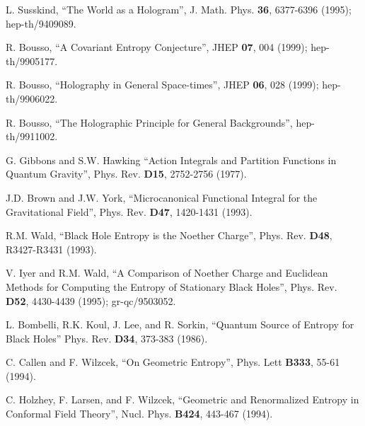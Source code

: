 \documentclass[12pt]{article}
\newcommand{\comment}[1]{}
\newcommand{\keywords}[1]{}
\begin{document}
\begin{thebibliography}{999}
\comment{article} L. Susskind, ``The World as a
Hologram'', J. Math. Phys. {\bf 36}, 6377-6396
(1995); hep-th/9409089. \keywords{quantum gravity, entropy bounds}

\comment{article} R. Bousso, ``A Covariant Entropy
Conjecture'', JHEP {\bf 07}, 004 (1999);
hep-th/9905177. \keywords{quantum gravity, entropy bounds}

\comment{article} R. Bousso, ``Holography in General
Space-times'', JHEP {\bf 06}, 028 (1999);
hep-th/9906022. \keywords{quantum gravity, entropy bounds}

\comment{online} R. Bousso, ``The Holographic Principle
for General Backgrounds'', hep-th/9911002. \keywords{quantum gravity,
entropy bounds}

\comment{article} G. Gibbons and S.W. Hawking ``Action
Integrals and Partition Functions in Quantum Gravity'',
Phys. Rev. {\bf D15}, 2752-2756 (1977).  \keywords{black hole
thermodynamics, quantum gravity}

\comment{article} J.D. Brown and J.W. York,
``Microcanonical Functional Integral for the Gravitational Field'',
Phys. Rev. {\bf D47}, 1420-1431 (1993).  \keywords{black hole
thermodynamics, quantum gravity}

\comment{article} R.M. Wald, ``Black Hole Entropy is the
Noether Charge'', Phys. Rev. {\bf D48}, R3427-R3431 (1993).
\keywords{black hole thermodynamics, black holes, variational
principles}

\comment{article} V. Iyer and R.M. Wald, ``A Comparison
of Noether Charge and Euclidean Methods for Computing the Entropy of
Stationary Black Holes'', Phys. Rev. {\bf D52}, 4430-4439 (1995);
gr-qc/9503052.  \keywords{black hole thermodynamics, black holes,
quantum gravity}

\comment{article} L. Bombelli, R.K. Koul, J. Lee, and
R. Sorkin, ``Quantum Source of Entropy for Black Holes''
Phys. Rev. {\bf D34}, 373-383 (1986).  \keywords{black hole
thermodynamics, quantum gravity}

\comment{article} C. Callen and F. Wilzcek, ``On Geometric
Entropy'', Phys. Lett {\bf B333}, 55-61 (1994).  \keywords{black hole
thermodynamics, quantum gravity}

\comment{article} C. Holzhey, F. Larsen, and F. Wilzcek,
``Geometric and Renormalized Entropy in Conformal Field Theory'',
Nucl. Phys. {\bf B424}, 443-467 (1994).  \keywords{black hole
thermodynamics, quantum gravity}


\end{thebibliography}
\end{document}
